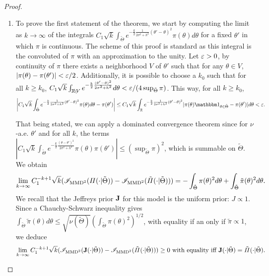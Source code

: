 \begin{proof}
\begin{enumerate}
    \item To prove the first statement of the theorem, 
    we start by  computing the limit as $k\to\infty$ of the integrals  $C_1\sqrt{k}\int_{\tilde\Theta}e^{-\frac{k}{2}\frac{1}{2\sigma^2+h^2}(\theta'-\theta)^2}\pi(\theta)d\theta $ for a fixed $\theta'$ in which $\pi$ is continuous. The scheme of this proof is standard as this integral is the convoluted of  $\pi$ with an approximation to the unity. Let $\varepsilon>0$, by continuity of $\pi$ there exists a neighborhood $V$ of $\theta'$ such that for any $\theta\in V$,  $|\pi(\theta)-\pi(\theta')|<\varepsilon/2$. %
    Additionally, it is possible to choose a $k_0$ such that for all $k\geq k_0$, $C_1\sqrt{k}\int_{\mathbb{R}\!\setminus\!V} e^{-\frac{k}{2}\frac{(\theta'-\theta)^2}{2\sigma^2+h^2}}d\theta <\varepsilon/(4\sup_{\tilde\Theta}\pi)$. This way, for all $k\geq k_0$,
        \begin{equation}
            \left|C_1\sqrt{k}\int_{\tilde\Theta}e^{-\frac{k}{2}\frac{1}{2\sigma^2+h^2}(\theta'-\theta)^2}\pi(\theta)d\theta -\pi(\theta')  \right| \leq C_1\sqrt{k}\int_{\RR}e^{-\frac{k}{2}\frac{1}{2\sigma^2+h^2}(\theta'-\theta)^2} |\pi(\theta)\indic_{\theta\in\tilde\Theta}-\pi(\theta')|d\theta 
            <\eps.
        \end{equation}
    
    That being stated, we can apply a dominated convergence theorem since for $\nu$-a.e. $\theta'$ and for all $k$, the terms $|C_1\sqrt{k}\int_{\tilde\Theta} e^{-\frac{k}{2}\frac{(\theta-\theta')^2}{2\sigma^2+h^2}}\pi(\theta)\pi(\theta') |\leq(\sup_{\tilde\Theta}\pi)^2$, which is summable on $\tilde\Theta$.
    We obtain
    \begin{equation}
        \lim_{k\rightarrow\infty} C_1^{-k+1}\sqrt{k}(\mathscr{I}_{\text{MMD}^2}(\varPi(\cdot|\tilde\Theta))-\mathscr{I}_{\text{MMD}^2}(\tilde\varPi(\cdot|\tilde\Theta)) ) = -\int_{\tilde\Theta}\pi(\theta)^2d\theta + \int_{\tilde\Theta}\tilde\pi(\theta)^2d\theta.
    \end{equation}
    We recall that the Jeffreys prior $\mathbf{J} $ for this model is the uniform prior: $J\propto 1$.
    Since a Chauchy-Schwarz inequality gives $\int_{\tilde\Theta}\tilde\pi(\theta)d\theta \leq \sqrt{\nu(\tilde\Theta)} \left(\int_{\tilde\Theta}\pi(\theta)^2 \right)^{1/2}$, with equality if an only if $\tilde\pi\propto 1$, we deduce 
    \begin{equation}
        \lim_{k\rightarrow\infty} C_1^{-k+1}\sqrt{k}(\mathscr{I}_{\text{MMD}^2}(\mathbf{J}(\cdot|\tilde\Theta))-\mathscr{I}_{\text{MMD}^2}(\tilde\varPi(\cdot|\tilde\Theta)) ) \geq 0 \text{\ with equality iff\ }\mathbf{J}(\cdot|\tilde\Theta) = \tilde\varPi(\cdot|\tilde\Theta).
    \end{equation}


\end{enumerate}
\end{proof}
